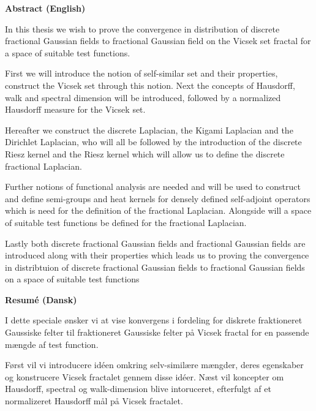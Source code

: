 
\begin{center}
	\LARGE \textbf{Abstract (English)}
\end{center}

In this thesis we wish to prove the convergence in distribution of discrete fractional Gaussian fields to fractional Gaussian field on the Vicsek set fractal for a space of suitable test functions.

\vspace{5mm}
First we will introduce the notion of self-similar set and their properties, construct the Vicsek set through this notion. Next the concepts of Hausdorff, walk and spectral dimension will be introduced, followed by a normalized Hausdorff measure for the Vicsek set.

\vspace{5mm}
Hereafter we construct the discrete Laplacian, the Kigami Laplacian and the Dirichlet Laplacian, who will all be followed by the introduction of the discrete Riesz kernel and the Riesz kernel which will allow us to define the discrete fractional Laplacian. 

Further notions of functional analysis are needed and will be used to construct and define semi-groups and heat kernels for densely defined self-adjoint operators which is need for the definition of the fractional Laplacian.
Alongside will a space of suitable test functions be defined for the fractional Laplacian.

\vspace{5mm}
Lastly both discrete fractional Gaussian fields and fractional Gaussian fields are introduced along with their properties which leads us to proving the convergence in distribtuion of discrete fractional Gaussian fields to fractional Gaussian fields on a space of suitable test functions

\newpage

\begin{center}
	\LARGE \textbf{Resumé (Dansk)}
\end{center}

I dette speciale ønsker vi at vise konvergens i fordeling for diskrete fraktioneret Gaussiske felter til fraktioneret Gaussiske felter på Vicsek fractal for en passende mængde af test function.

\vspace{5mm}
Først vil vi introducere idéen omkring selv-similære mængder, deres egenskaber og konstrucere Vicsek fractalet gennem disse idéer. Næst vil koncepter om Hausdorff, spectral og walk-dimension blive intoruceret, efterfulgt af et normalizeret Hausdorff mål på Vicsek fractalet.

